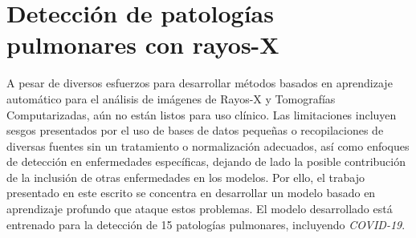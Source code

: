 \section{Detección de patologías pulmonares con rayos-X}

A pesar de diversos esfuerzos para desarrollar métodos basados en aprendizaje automático para el
análisis de imágenes de Rayos-X y Tomografías Computarizadas, aún no están listos para uso clínico.
Las limitaciones incluyen sesgos presentados por el uso de bases de datos pequeñas o recopilaciones
de diversas fuentes sin un tratamiento o normalización adecuados, así como enfoques de detección en
enfermedades específicas, dejando de lado la posible contribución de la inclusión de otras
enfermedades en los modelos. Por ello, el trabajo presentado en este escrito se concentra en
desarrollar un modelo basado en aprendizaje profundo que ataque estos problemas. El modelo
desarrollado está entrenado para la detección de 15 patologías pulmonares, incluyendo \textit{COVID-19}.


